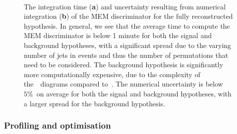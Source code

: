 \begin{figure}
\begin{centering}
\\
\caption{The integration time (\textbf{a}) and uncertainty resulting from numerical integration (\textbf{b}) of the MEM discriminator for the fully reconstructed hypothesis. In general, we see that the average time to compute the MEM discriminator is below 1 minute for both the signal and background hypotheses, with a significant spread due to the varying number of jets in events and thus the number of permutations that need to be considered. The background hypothesis is significantly more computationally expensive, due to the complexity of the~\ttbb~diagrams compared to~\ttHbb. The numerical uncertainty is below~$5\%$~on average for both the signal and background hypotheses, with a larger spread for the background hypothesis.}
\label{fig:mem_numerical_accuracy}
\end{centering}
\end{figure}

\subsubsection{Profiling and optimisation}
\label{sec:mem_optimization}

